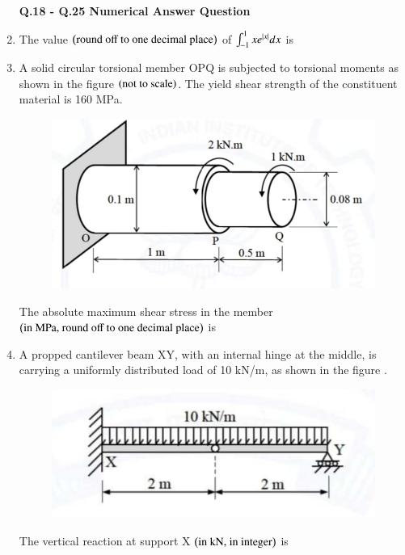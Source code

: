 \documentclass[journal,12pt,onecolumn]{article}
\theoremstyle{remark}
\begin{document}
\begin{enumerate}
\textbf{Q.18 - Q.25 Numerical Answer Question }
\item The value $\left(\text{round off to one decimal place}\right)$ of $\int_{-1}^{1} x e^{\left\vert x\right\vert} dx$ is \underline{\hspace{2cm}}

\hfill{}

\item A solid circular torsional member OPQ is subjected to torsional moments as shown in the figure  $\left(\text{not to scale}\right)$. The yield shear strength of the constituent material is 160 MPa.
\begin{figure}[H]
    \centering
    \includegraphics[width=0.7\columnwidth]{figs/2q19.jpg}
    \caption{}
    \label{fig:q19}
\end{figure}
The absolute maximum shear stress in the member $\left(\text{in MPa, round off to one decimal place}\right)$ is \underline{\hspace{2cm}}

\hfill{}

\item A propped cantilever beam XY, with an internal hinge at the middle, is carrying a uniformly distributed load of 10 kN/m, as shown in the figure .
\begin{figure}[H]
    \centering
    \includegraphics[width=0.7\columnwidth]{figs/2q20.jpg}
    \caption{}
    \label{fig:q20}
\end{figure}
The vertical reaction at support X $\left(\text{in kN, in integer}\right)$ is \underline{\hspace{2cm}}


\end{enumerate}
\end{document}
